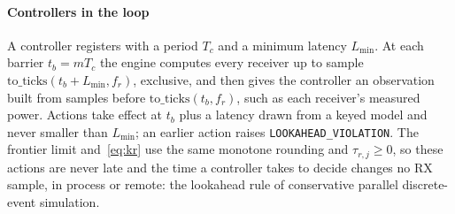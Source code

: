 \paragraph*{Controllers in the loop}
A controller registers with a period $T_c$ and a minimum latency
$L_{\min}$. At each barrier $t_b=mT_c$ the engine computes every receiver up to sample
$\mathrm{to\_ticks}(t_b+L_{\min},f_r)$, exclusive, and then gives the controller an
observation built from samples before $\mathrm{to\_ticks}(t_b,f_r)$, such as each receiver's
measured power. Actions take effect at $t_b$ plus a latency drawn
from a keyed model and never smaller than $L_{\min}$; an earlier action raises
\texttt{LOOKAHEAD\_VIOLATION}. The frontier limit and~\eqref{eq:kr} use the same
monotone rounding and $\tau_{r,j}\ge0$, so these actions are never late and the time a
controller takes to decide changes no RX sample, in process or remote: the lookahead
rule of conservative parallel discrete-event simulation.


